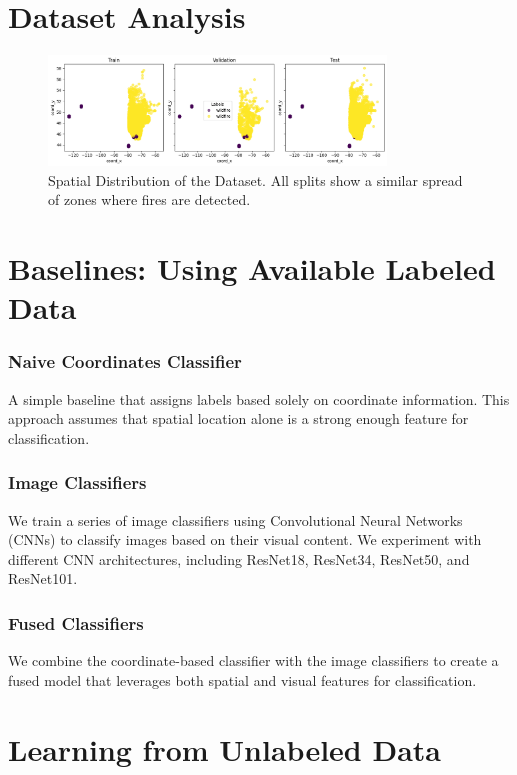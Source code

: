 \documentclass{article}
\begin{document}
\section{Dataset Analysis}

\begin{figure}
  \centering
  \includegraphics[width=0.8\textwidth]{figures/coord_label.png}
  \caption{Spatial Distribution of the Dataset. All splits show a similar spread of zones where fires are detected.}
  \label{fig:dataset_analysis}
\end{figure}

\section{Baselines: Using Available Labeled Data}

\subsubsection{Naive Coordinates Classifier}
A simple baseline that assigns labels based solely on coordinate information.
This approach assumes that spatial location alone is a strong enough feature
for classification.

\subsubsection{Image Classifiers}
We train a series of image classifiers using Convolutional Neural Networks
(CNNs) to classify images based on their visual content. We experiment with
different CNN architectures, including ResNet18, ResNet34, ResNet50, and ResNet101.

\subsubsection{Fused Classifiers}
We combine the coordinate-based classifier with the image classifiers to create
a fused model that leverages both spatial and visual features for classification. 

\section{Learning from Unlabeled Data}
\end{document}
